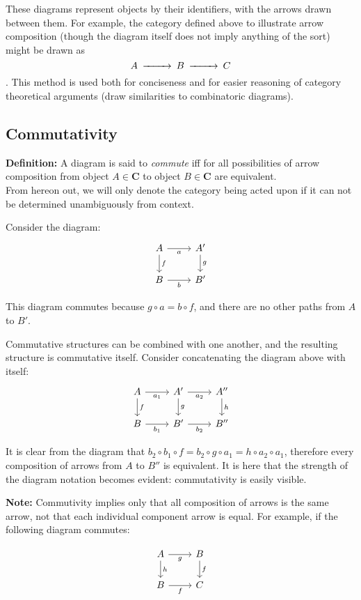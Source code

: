 \documentclass[]{article}
\newcommand{\what}{}
\newcommand{\cat}[1]{\mathbf{#1}}
\newcommand{\defn}[2]{
\renewcommand{\what}{\textit{#1} }
\textbf{Definition:} #2\\
}
\newcommand{\diag}[1]{$$\begin{CD}#1\end{CD}$$}
\newcommand{\cdr}[1]{\arrow[swap]{r}{#1}}
\newcommand{\cdd}[1]{\arrow{d}{#1}}
\begin{document}
These diagrams represent objects by their identifiers, with the arrows drawn between them. For example, the category defined above to illustrate arrow composition (though the diagram itself does not imply anything of the sort) might be drawn as
\diag{
A @>>> B @>>> C
}
. This method is used both for conciseness and for easier reasoning of category theoretical arguments (draw similarities to combinatoric diagrams). 

\subsection{Commutativity}

\defn{commutativity}{A diagram is said to \textit{commute} iff for all possibilities of arrow composition from object $A \in \cat{C}$ to object $B \in \cat{C}$ are equivalent.}

From hereon out, we will only denote the category being acted upon if it can not be determined unambiguously from context.

Consider the diagram:
$$\begin{tikzcd}
A \cdr{a} \cdd{f} & A' \cdd{g} \\
B \cdr{b} & B'
\end{tikzcd}$$

This diagram commutes because $g\circ a = b\circ f$, and there are no other paths from $A$ to $B'$.

Commutative structures can be combined with one another, and the resulting structure is commutative itself. Consider concatenating the diagram above with itself:
$$\begin{tikzcd}
A \cdr{a_1} \cdd{f} & A' \cdr{a_2} \cdd{g} & A'' \cdd{h} \\
B \cdr{b_1} & B' \cdr{b_2} & B''
\end{tikzcd}$$

It is clear from the diagram that $b_2\circ b_1\circ f = b_2\circ g\circ a_1 = h\circ a_2 \circ a_1$, therefore every composition of arrows from $A$ to $B''$ is equivalent. It is here that the strength of the diagram notation becomes evident: commutativity is easily visible.

\textbf{Note:} Commutivity implies only that all composition of arrows is the same arrow, not that each individual component arrow is equal. For example, if the following diagram commutes:

$$\begin{tikzcd}
A \cdr{g} \cdd{h} & B \cdd{f} \\
B \cdr{f} & C
\end{tikzcd}$$
\end{document}
